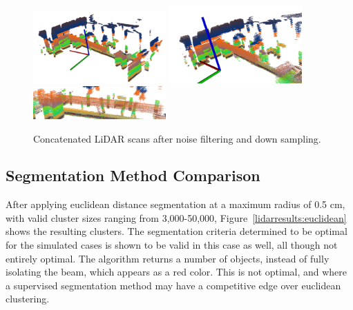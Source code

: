 \documentclass[12pt]{drexelthesis}
\let\Oldsubsection\subsection
\renewcommand{\subsection}{\FloatBarrier\Oldsubsection}
\begin{document}
\begin{figure}[!ht]
	\centering
		\includegraphics[width=2in]{images/real-lab-scans/filtered0.png}
		\includegraphics[width=2in]{images/real-lab-scans/filtered1.png}
		\includegraphics[width=2in]{images/real-lab-scans/filtered2.png}
		\caption[Concatenated LiDAR scans after noise filtering and down sampling]{\centering Concatenated LiDAR scans after noise filtering and down sampling.}
	\label{lidarresults:filtered}
\end{figure}

\subsection{Segmentation Method Comparison}

After applying euclidean distance segmentation at a maximum radius of 0.5 cm, with valid cluster sizes ranging from 3,000-50,000, Figure~\ref{lidarresults:euclidean} shows the resulting clusters. The segmentation criteria determined to be optimal for the simulated cases is shown to be valid in this case as well, all though not entirely optimal. The algorithm returns a number of objects, instead of fully isolating the beam, which appears as a red color. This is not optimal, and where a supervised segmentation method may have a competitive edge over euclidean clustering.
\end{document}

